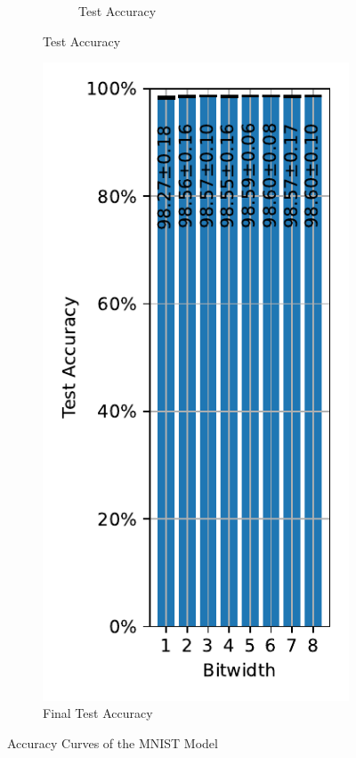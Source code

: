 \begin{figure}[H]
\begin{subfigure}[H]{0.69\textwidth}
\begin{subfigure}[H]{\textwidth}
                    \caption{Test Accuracy}
                \end{subfigure}
            \end{subfigure}
            \hfill
            \begin{subfigure}[H]{0.3\textwidth}
                \centering
                \includegraphics[width=\textwidth]{../standard/MNIST/plots/mnist_final_acc.pdf}
                \caption{Final Test Accuracy}
            \end{subfigure}
            \caption{Accuracy Curves of the MNIST Model}
        \end{figure}
    
